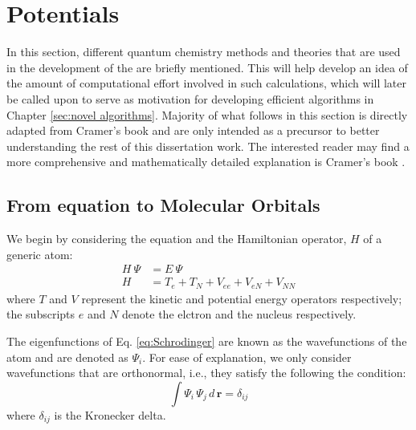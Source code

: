     \section{\AbInitio{} Potentials}
        In this section, different quantum chemistry methods and theories that are used in the development of the \abInitio{} \PESs{} are briefly mentioned. This will help develop an idea of the amount of computational effort involved in such calculations, which will later be called upon to serve as motivation for developing efficient algorithms in Chapter \ref{sec:novel algorithms}. Majority of what follows in this section is directly adapted from Cramer's \cite{Cramer} book and are only intended as a precursor to better understanding the rest of this dissertation work. The interested reader may find a more comprehensive and mathematically detailed explanation is Cramer's book \cite{Cramer}.\\
        \subsection{From \Schrodinger{} equation to Molecular Orbitals}
            We begin by considering the \Schrodinger{} equation and the Hamiltonian operator, $H$ of a generic atom:
            \begin{equation}\label{eq:Schrodinger}
                \begin{aligned}
                    H~\Psi &= E~\Psi \\
                    H &= T_e + T_N + V_{ee} + V_{eN} + V_{NN}
                \end{aligned}
            \end{equation}
            where $T$ and $V$ represent the kinetic and potential energy operators respectively; the subscripts $e$ and $N$ denote the elctron and the nucleus respectively.

            The eigenfunctions of Eq. \eqref{eq:Schrodinger} are known as the wavefunctions of the atom and are denoted as $\Psi_i$. For ease of explanation, we only consider wavefunctions that are orthonormal, i.e., they satisfy the following the condition:
            \begin{equation}\label{eq:orthonormality}
                \int \Psi_i\, \Psi_j\, d\, \mathbf{r} = \delta_{ij}
            \end{equation}
            where $\delta_{ij}$ is the Kronecker delta.

